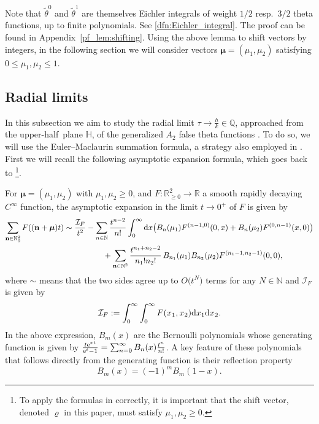 \documentclass[10pt,a4paper]{amsart}
\def\BR{\mathbb{R}}
\def\bos{\varrho}
\def\bmu{\boldsymbol{\mu}}
\theoremstyle{definition}
\numberwithin{equation}{section}
\begin{document}
Note that ${\tilde \theta}^0$ and ${\tilde \theta}^1$ are themselves Eichler integrals of weight $1/2$ resp.\ $3/2$ theta functions, up to finite polynomials. See \eqref{dfn:Eichler_integral}.
The proof can be found in Appendix~\ref{pf_lem:shifting}.
Using the above lemma to shift vectors by integers, in the following section we will consider vectors $\bmu=(\mu_1,\mu_2)$ satisfying $ 0\leq \mu_1, \mu_2 \leq 1$.

\subsection{Radial limits}
\label{subsec:rad_lim}

In this subsection we aim to study the radial limit $\tau \to \frac{h}{k}\in\mathbb{Q}$, approached from the upper-half~plane $\mathbb H$, of the generalized $A_{2}$ false theta functions \smash{$F^{(\bos)}(\tau)$}. To do so, we will use the Euler--Maclaurin summation formula, a strategy also employed in \cite{bringmann2018higher}. First we will recall the following asymptotic expansion formula, which goes back to \cite{Zagier77}\footnote{To apply the formulas in \cite{Zagier77} correctly, it is important that the shift vector, denoted $\bos$ in this paper, must satisfy $\mu_1, \mu_2 \geq 0$.}.

For $\bmu=(\mu_1,\mu_2)$ with $ \mu_1, \mu_2\geq 0$, and $F\colon \BR^2_{\geq 0}\to\BR$ a smooth rapidly decaying $C^\infty$ function, the asymptotic expansion in the limit $t\to 0^+$ of $F$ is given by \cite{Zagier77}
\begin{gather}
		\sum_{\mathbf{n}\in\mathbb{N}_0^2} F((\mathbf{n} + \bmu) t ) \sim \frac{\mathcal{I}_F}{t^2} - \sum_{n\in\mathbb{N}} \frac{t^{n-2} }{ n! } \int_0^\infty {\rm d}x \bigl( {B_{n}(\mu_1)} F^{(n-1,0)} (0,x) +{B_{n}(\mu_2)} F^{(0,n-1)} (x,0) \bigr) \nonumber\\
\hphantom{\sum_{\mathbf{n}\in\mathbb{N}_0^2} F((\mathbf{n} + \bmu) t ) \sim}{}
 +
		\sum_{\mathbf{n}\in\mathbb{N}^2} \frac{ t^{n_1+n_2-2} }{ n_1! n_2! }\,B_{n_1}(\mu_1) B_{n_2}(\mu_2)
		F^{(n_1-1,n_2-1)} (0,0),\label{def:EM}
\end{gather}
where $\sim$ means that the two sides agree up to $O\bigl(t^N\bigr)$ terms for any $N\in\mathbb{N}$ and $\mathcal{I}_F$ is given by
\[
\mathcal{I}_F:=\int_0^\infty\int_0^\infty F(x_1,x_2){\rm d}x_1{\rm d}x_2 .
\]
In the above expression, $B_m(x)$ are the Bernoulli polynomials whose generating function is given by $\frac{t{\rm e}^{xt}}{ {\rm e}^t-1} = \sum_{n=0}^\infty B_n(x)\frac{t^n}{n!}$. A key feature of these polynomials that follows directly from the generating function is their reflection property
\begin{equation}\label{reflectionpropertyBernoulli}
	B_{m}(x)=(-1)^m B_{m}(1-x) .
\end{equation}
\end{document}
